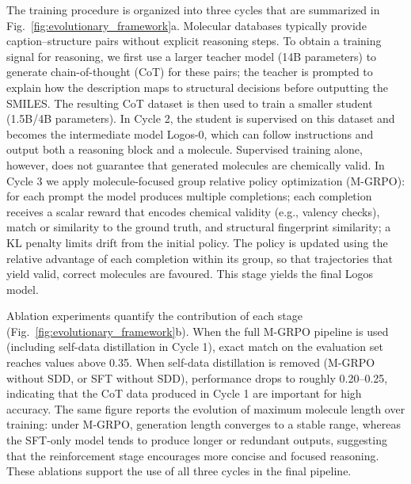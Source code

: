 \documentclass[11pt]{article}
\begin{document}
The training procedure is organized into three cycles that are summarized in Fig.~\ref{fig:evolutionary_framework}a. Molecular databases typically provide caption--structure pairs without explicit reasoning steps\cite{wei2022cot,edwards2022molt5,hastings2016chebi}. To obtain a training signal for reasoning, we first use a larger teacher model (14B parameters) to generate chain-of-thought (CoT) for these pairs; the teacher is prompted to explain how the description maps to structural decisions before outputting the SMILES. The resulting CoT dataset is then used to train a smaller student (1.5B/4B parameters). In Cycle 2, the student is supervised on this dataset and becomes the intermediate model Logos-0, which can follow instructions and output both a reasoning block and a molecule. Supervised training alone, however, does not guarantee that generated molecules are chemically valid\cite{olivecrona2017reinvent,ronan2024reinvent4}. In Cycle 3 we apply molecule-focused group relative policy optimization (M-GRPO)\cite{shao2024grpo}: for each prompt the model produces multiple completions; each completion receives a scalar reward that encodes chemical validity (e.g., valency checks), match or similarity to the ground truth, and structural fingerprint similarity; a KL penalty limits drift from the initial policy. The policy is updated using the relative advantage of each completion within its group, so that trajectories that yield valid, correct molecules are favoured. This stage yields the final Logos model.

Ablation experiments quantify the contribution of each stage (Fig.~\ref{fig:evolutionary_framework}b). When the full M-GRPO pipeline is used (including self-data distillation in Cycle 1), exact match on the evaluation set reaches values above 0.35. When self-data distillation is removed (M-GRPO without SDD, or SFT without SDD), performance drops to roughly 0.20--0.25, indicating that the CoT data produced in Cycle 1 are important for high accuracy. The same figure reports the evolution of maximum molecule length over training: under M-GRPO, generation length converges to a stable range, whereas the SFT-only model tends to produce longer or redundant outputs, suggesting that the reinforcement stage encourages more concise and focused reasoning. These ablations support the use of all three cycles in the final pipeline.
\end{document}
